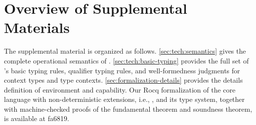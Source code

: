 \section{Overview of Supplemental Materials}

The supplemental material is organized as follows.
\autoref{sec:tech:semantics} gives the complete operational semantics
of \langname{}.  \autoref{sec:tech:basic-typing} provides the full set
of \langname{}'s basic typing rules, qualifier typing rules, and
well-formedness judgments for context types and type contexts.
\autoref{sec:formalization-details} provides the details definition of
environment and capability.  Our Rocq formalization of the core
language with non-deterministic extensions, i.e., \langNDname{}, and
its type system, together with machine-checked proofs of the
fundamental theorem and soundness theorem, is available at fa6819.
